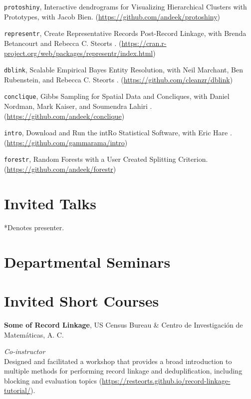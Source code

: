 \documentclass[margin,line]{res}
\begin{document}
\begin{resume}
\begin{enumerate}[label={[\arabic*]}, labelsep=.35cm]
\item \texttt{protoshiny}, Interactive dendrograms for Visualizing Hierarchical Clusters with Prototypes, with Jacob Bien. (\url{https://github.com/andeek/protoshiny})
\item \texttt{representr}, Create Representative Records Post-Record Linkage, with Brenda Betancourt and Rebecca C. Steorts \cite{kaplan2018posterior}. (\url{https://cran.r-project.org/web/packages/representr/index.html})
\item \texttt{dblink}, Scalable Empirical Bayes Entity Resolution, with Neil Marchant, Ben Rubenstein, and Rebecca C. Steorts \cite{marchant2020dblink}. (\url{https://github.com/cleanzr/dblink})
\item \texttt{conclique}, Gibbs Sampling for Spatial Data and Concliques, with Daniel Nordman, Mark Kaiser, and Soumendra Lahiri \cite{kaplan2016geometrically}. (\url{https://github.com/andeek/conclique})
\item \texttt{intro}, Download and Run the intRo Statistical Software, with Eric Hare \cite{hare2017introductory}. (\url{https://github.com/gammarama/intro})
\item \texttt{forestr}, Random Forests with a User Created Splitting Criterion. (\url{https://github.com/andeek/forestr})
\end{enumerate}

\section{\sc Invited Talks}
*Denotes presenter.\\
\printbibliography[keyword=talk-invited, heading=none, resetnumbers=true]

\section{\sc Departmental Seminars}
\printbibliography[keyword=seminar, heading=none, resetnumbers=true]

\section{\sc Invited Short Courses}

{\bf Some of Record Linkage}, US Census Bureau \& Centro de Investigaci\'{o}n de Matem\'{a}ticas, A. C.

\vspace{-.3cm}
{\em Co-instructor} \hfill \\
Designed and facilitated a workshop that provides a broad introduction to multiple methods for performing record linkage and deduplification, including blocking and evaluation topics (\url{https://resteorts.github.io/record-linkage-tutorial/}).



\end{resume}
\end{document}
